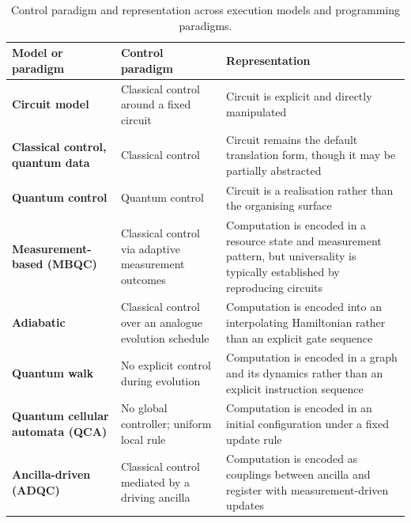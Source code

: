 \begin{table}[htbp]
    \centering
    \caption{Control paradigm and representation across execution models and programming paradigms.}
    \label{tab:lit_rev:quantum_programming:design_space_map_ctrl_rep}
    \footnotesize
    \begin{tabularx}{\textwidth}{@{}p{2.0cm}XX@{}}
		\toprule
        \textbf{Model or paradigm} & \textbf{Control paradigm} & \textbf{Representation} \\
        \midrule
        \textbf{Circuit model} & Classical control around a fixed circuit & Circuit is explicit and directly manipulated \\
        \addlinespace
        \textbf{Classical control, quantum data} & Classical control & Circuit remains the default translation form, though it may be partially abstracted \\
        \addlinespace
        \textbf{Quantum control} & Quantum control & Circuit is a realisation rather than the organising surface \\
        \addlinespace
        \textbf{Measurement-based (MBQC)} & Classical control via adaptive measurement outcomes & Computation is encoded in a resource state and measurement pattern, but universality is typically established by reproducing circuits \\
        \addlinespace
        \textbf{Adiabatic} & Classical control over an analogue evolution schedule & Computation is encoded into an interpolating Hamiltonian rather than an explicit gate sequence \\
        \addlinespace
        \textbf{Quantum walk} & No explicit control during evolution & Computation is encoded in a graph and its dynamics rather than an explicit instruction sequence \\
        \addlinespace
        \textbf{Quantum cellular automata (QCA)} & No global controller; uniform local rule & Computation is encoded in an initial configuration under a fixed update rule \\
        \addlinespace
        \textbf{Ancilla-driven (ADQC)} & Classical control mediated by a driving ancilla & Computation is encoded as couplings between ancilla and register with measurement-driven updates \\
        \bottomrule
    \end{tabularx}
\end{table}

